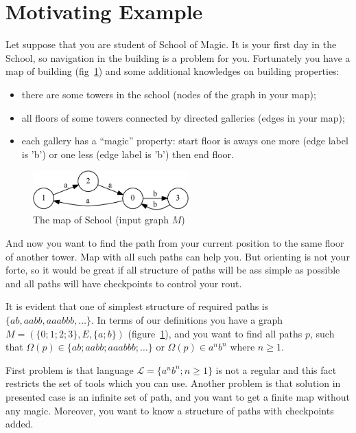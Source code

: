 \section{Motivating Example}\label{motivExample}

Let suppose that you are student of School of Magic.
It is your first day in the School, so navigation in the building is a problem for you.
Fortunately you have a map of building (fig~\ref{input}) and some additional knowledges on building properties:
\begin{itemize}
  \item there are some towers in the school (nodes of the graph in your map);
  \item all floors of some towers connected by directed galleries (edges in your map);
  \item each gallery has a ``magic'' property: start floor is aways one more (edge label is 'b') or one less (edge label is 'b') then end floor. 
\end{itemize}

\begin{figure}[h]
    \begin{center}
        \includegraphics[width=6cm]{dot/input.pdf}
        \caption{The map of School (input graph $M$)}
        \label{input}        
    \end{center}
\end{figure}


And now you want to find the path from your current position to the same floor of another tower. 
Map with all such paths can help you.
But orienting is not your forte, so it would be great if all structure of paths will be ass simple as possible and all paths will have checkpoints to control your rout.

It is evident that one of simplest structure of required paths is $\{ab, aabb, aaabbb, \dots\}$.
In terms of our definitions you have a graph $M=(\{0;1;2;3\},E,\{a;b\})$ (figure~\ref{input}), and you want to find all paths $p$, such that $\Omega(p) \in \{ab; aabb; aaabbb; \dots\}$ or $\Omega(p) \in a^n b^n$ where $n \geq 1$.


First problem is that language $\mathcal{L} = \{a^n b^n; n \geq 1\}$ is not a regular and this fact restricts the set of tools which you can use. 
Another problem is that solution in presented case is an infinite set of path, and you want to get a finite map without any magic.  
Moreover, you want to know a structure of paths with checkpoints added.


